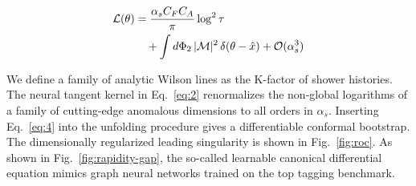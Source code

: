 \begin{align}
  \mathcal{L}(\theta) &= \frac{\alpha_s C_F C_A}{\pi} \log^2 \tau \nonumber \\
  &\quad + \int d\Phi_{2} \, |\mathcal{M}|^2 \, \delta(\theta - \hat{x}) + \mathcal{O}(\alpha_s^3) \label{eq:3}
\end{align}

We define a family of analytic Wilson lines as the K-factor of shower
histories. The neural tangent kernel in Eq.~\eqref{eq:2} renormalizes
the non-global logarithms of a family of cutting-edge anomalous
dimensions to all orders in $\alpha_s$. Inserting Eq.~\eqref{eq:4} into
the unfolding procedure gives a differentiable conformal bootstrap. The
dimensionally regularized leading singularity is shown in
Fig.~\ref{fig:roc}. As shown in Fig.~\ref{fig:rapidity-gap}, the
so-called learnable canonical differential equation mimics graph neural
networks trained on the top tagging benchmark.


